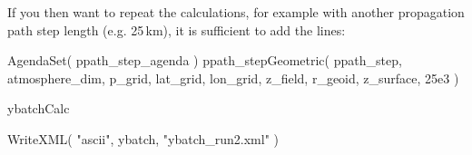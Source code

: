 If you then want to repeat the calculations, for example with another
propagation path step length (e.g. 25\,km), it is sufficient to add
the lines:

\begin{code}
AgendaSet( ppath_step_agenda ){
   ppath_stepGeometric( ppath_step, atmosphere_dim, p_grid,
                        lat_grid, lon_grid,
                        z_field, r_geoid, z_surface,
                        25e3 )
}

ybatchCalc

WriteXML( "ascii", ybatch, "ybatch_run2.xml" )
\end{code}


